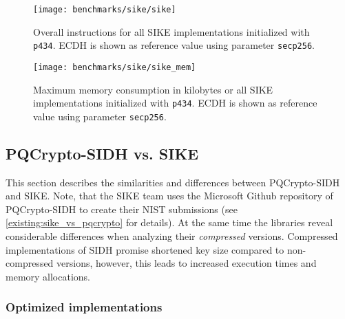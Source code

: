 \begin{figure}[H]
  \centering
  \texttt{[image: benchmarks/sike/sike]}
  \caption[Overall instructions \gls{SIKE}]
  {Overall instructions for all \gls{SIKE} implementations initialized with \texttt{p434}. \gls{ECDH} is shown as reference value using parameter \texttt{secp256}.}
  \label{fig:results_sike}
\end{figure}

\begin{figure}[H]
  \centering
  \texttt{[image: benchmarks/sike/sike\_mem]}
  \caption[Maximum memory consumption \gls{SIKE}]
  {Maximum memory consumption in kilobytes or all \gls{SIKE} implementations initialized with \texttt{p434}. \gls{ECDH} is shown as reference value using parameter \texttt{secp256}.}
  \label{fig:results_sike_mem}
\end{figure}

\subsection{\gls{PQCrypto-SIDH} vs. \gls{SIKE}}

This section describes the similarities and differences between \gls{PQCrypto-SIDH} and \gls{SIKE}. Note, that the \gls{SIKE} team uses the Microsoft Github repository of \gls{PQCrypto-SIDH} to create their \gls{NIST} submissions (see \autoref{existing:sike_vs_pqcrypto} for details). At the same time the libraries reveal considerable differences when analyzing their \textit{compressed} versions. Compressed implementations of \gls{SIDH} promise shortened key size compared to non-compressed versions, however, this leads to increased execution times and memory allocations. 
\\
\subsubsection{Optimized implementations}

